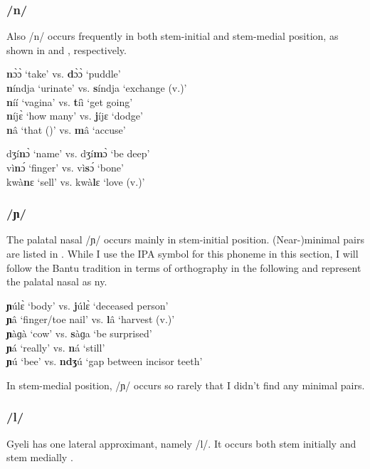 \subsubsection*{\bfseries /n/} Also /n/ occurs frequently in both stem-initial and stem-medial position, as shown in  and , respectively.

\ea \label{n}
{\bfseries n}ɔ̀ɔ̀ `take' vs. {\bfseries d}ɔ̀ɔ̀ `puddle' \\
{\bfseries n}índja `urinate' vs. {\bfseries s}índja `exchange (v.)' \\
{\bfseries n}íí `vagina' vs. {\bfseries t}íì `get going' \\
{\bfseries n}íjɛ̀ `how many' vs. {\bfseries j}íjɛ `dodge' \\
{\bfseries n}â `that ({\COMP})' vs. {\bfseries m}â `accuse'
\z

\ea \label{nm}
dʒí{\bfseries n}ɔ̀ `name' vs. dʒí{\bfseries m}ɔ̀ `be deep' \\
vì{\bfseries n}ɔ́ `finger' vs. vì{\bfseries s}ɔ́ `bone' \\
kwà{\bfseries n}ɛ `sell' vs. kwà{\bfseries l}ɛ `love (v.)'
\z

\subsubsection*{\bfseries /ɲ/} The palatal nasal /ɲ/ occurs mainly in stem-initial position. (Near-)minimal pairs are listed in . While I use the IPA symbol for this phoneme in this section, I will follow the Bantu tradition in terms of orthography in the following and represent the palatal nasal as {\textlangle}ny{\textrangle}.

\ea \label{ny}
{\bfseries ɲ}úlɛ̀ `body' vs. {\bfseries j}úlɛ̀ `deceased person' \\
{\bfseries ɲ}â `finger/toe nail'  vs. {\bfseries l}â `harvest (v.)' \\
{\bfseries ɲ}àɡà `cow' vs. {\bfseries s}àɡa `be surprised' \\
{\bfseries ɲ}á `really' vs. {\bfseries n}á `still' \\
{\bfseries ɲ}ú `bee' vs. {\bfseries ndʒ}ú `gap between incisor teeth'
\z

\noindent In stem-medial position, /ɲ/ occurs so rarely that I didn't find any minimal pairs. 

\subsubsection*{\bfseries /l/} Gyeli has one lateral approximant, namely /l/. It occurs both stem initially  and stem medially .

